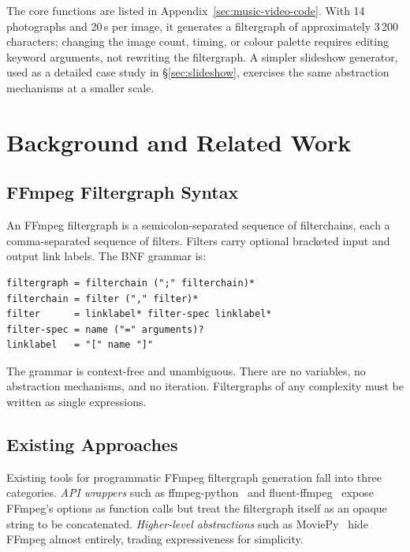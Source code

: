 \documentclass[english,submission]{programming}
\begin{document}
The core functions are listed in Appendix~\ref{sec:music-video-code}. With 14 photographs and 20\,s per image, it generates a filtergraph of approximately 3\,200 characters; changing the image count, timing, or colour palette requires editing keyword arguments, not rewriting the filtergraph. A simpler slideshow generator, used as a detailed case study in \S\ref{sec:slideshow}, exercises the same abstraction mechanisms at a smaller scale.

\section{Background and Related Work}

\subsection{FFmpeg Filtergraph Syntax}

An FFmpeg filtergraph is a semicolon-separated sequence of filterchains, each a comma-separated sequence of filters. Filters carry optional bracketed input and output link labels. The BNF grammar is:

\begin{lstlisting}[language=BNF, caption={FFmpeg filtergraph grammar (simplified)}]
filtergraph = filterchain (";" filterchain)*
filterchain = filter ("," filter)*
filter      = linklabel* filter-spec linklabel*
filter-spec = name ("=" arguments)?
linklabel   = "[" name "]"
\end{lstlisting}

The grammar is context-free and unambiguous. There are no variables, no abstraction mechanisms, and no iteration. Filtergraphs of any complexity must be written as single expressions.

\subsection{Existing Approaches}

Existing tools for programmatic FFmpeg filtergraph generation fall into three categories. \emph{API wrappers} such as ffmpeg-python~\cite{ffmpegpython} and fluent-ffmpeg~\cite{fluentffmpeg} expose FFmpeg's options as function calls but treat the filtergraph itself as an opaque string to be concatenated. \emph{Higher-level abstractions} such as MoviePy~\cite{moviepy} hide FFmpeg almost entirely, trading expressiveness for simplicity.
\end{document}
